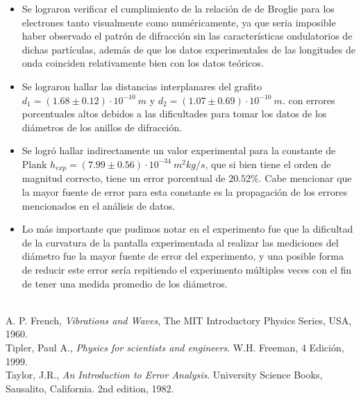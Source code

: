 \documentclass[prb,aps,twocolumn,preprintnumbers,amsmath,amssymb]{revtex4}
\begin{document}
\begin{itemize}

	\item Se lograron verificar el cumplimiento de la relación de de Broglie para los electrones tanto visualmente como numéricamente, ya que seria imposible haber observado el patrón de difracción sin las características ondulatorios de dichas partículas, además de que los datos experimentales de las longitudes de onda coinciden relativamente bien con los datos teóricos.
	
	\item Se lograron hallar las distancias interplanares del grafito $d_{1} = (1.68 \pm 0.12 )\cdot 10^{-10}\ m$ y $d_{2} = (1.07 \pm 0.69 )\cdot 10^{-10}\ m.$ con errores porcentuales altos debidos a las dificultades para tomar los datos de los diámetros de los anillos de difracción.
	
	\item Se logró hallar indirectamente un valor experimental para la constante de Plank $h_{exp} = (7.99 \pm 0.56) \cdot 10^{-34}\ m^2kg/s$, que si bien tiene el orden de magnitud correcto, tiene un error porcentual de $20.52\%$. Cabe mencionar que la mayor fuente de error para esta constante es la propagación de los errores mencionados en el análisis de datos.
		
	\item Lo más importante que pudimos notar en el experimento fue que la dificultad de la curvatura de la pantalla experimentada al realizar las mediciones del diámetro fue la mayor fuente de error del experimento, y una posible forma de reducir este error sería repitiendo el experimento múltiples veces con el fin de tener una medida promedio de los diámetros.
	
\end{itemize}

\begin{thebibliography}{99}
\
\\
 A. P. French, {\it Vibrations and Waves}{, The MIT Introductory Physics Series, USA, 1960}.\\
\bibitem{Tipler} Tipler, Paul A., \textit{Physics for scientists and engineers}. W.H. Freeman, 4 Edici\' on, 1999.\\
\bibitem{Taylor} Taylor, J.R., \textit{An Introduction to Error Analysis}. University Science Books, Sausalito, California. 2nd edition, 1982.\\
\end{thebibliography}
\end{document}

